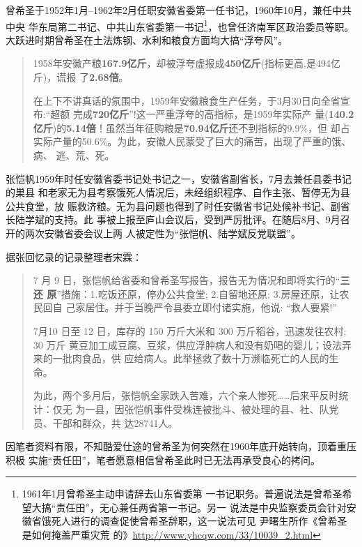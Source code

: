 曾希圣于1952年1月--1962年2月任职安徽省委第一任书记，1960年10月，兼任中共中央
华东局第二书记、中共山东省委第一书记\footnote{1961年1月曾希圣主动申请辞去山东省委第
  一书记职务。普遍说法是曾希圣希望大搞“责任田”，无心兼任两省第一书记。另一
  说法是中央监察委员会针对安徽省饿死人进行的调查促使曾希圣辞职，这一说法可见
  尹曙生所作《曾希圣是如何掩盖严重灾荒
  的》\url{http://www.yhcqw.com/33/10039_2.html}}，也曾任济南军区政治委员等职。
大跃进时期曾希圣在土法炼钢、水利和粮食方面均大搞“浮夸风”。

\begin{quotation}
  1958年安徽产粮\textbf{167.9亿斤}，却被浮夸虚报成\textbf{450亿斤}(指标更高,是494亿斤)，谎报
  了\textbf{2.68倍}。\cite{zhangfandang}

  在上下不讲真话的氛围中，1959年安徽粮食生产任务，于3月30日向全省宣布:“超额
  完成\textbf{720亿斤}”!这一严重浮夸的高指标，是1959年实际产
  量(\textbf{140.2亿斤})的\textbf{5.14倍}！虽然当年征购粮是\textbf{70.94亿斤}还不到指标的9.9\%，但
  却占实际产量的50.6\%。为此，安徽人民蒙受了巨大的痛苦，出现了严重的饿、病、
  逃、荒、死。\cite{zhang1959}
\end{quotation}

张恺帆1959年时任安徽省委书记处书记之一，安徽省副省长，7月去兼任县委书记的巣县
和老家无为县考察饿死人情况后，未经组织程序、自作主张、暂停无为县公共食堂，放
赈救济粮。无为县问题也得到了时任安徽省书记处候补书记、副省长陆学斌的支持。此
事被上报至庐山会议后，受到严厉批评。在随后8月、9月召开的两次安徽省委会议上两
人被定性为“张恺帆、陆学斌反党联盟”。

据张回忆录的记录整理者宋霖：
\begin{quotation}
  7 月 9 日，张恺帆给省委和曾希圣写报告，报告无为情况和即将实行的“\textbf{三还
    原}”措施：1.吃饭还原，停办公共食堂; 2.自留地还原; 3.房屋还原，让农民回自
  己家居住。并于当晚严令县委立即付诸实施，他说: “救人要紧!”

  7月10 日至 12 日，库存的 150 万斤大米和 300 万斤稻谷，迅速发往农村; 30 万斤
  黄豆加工成豆腐、豆浆，供应浮肿病人和没有奶喝的婴儿；设法弄来的一批肉食品，供
  应给病人。此举拯救了数十万濒临死亡的人民的生命。

  为此，两个多月后，张恺帆全家跌入苦难，六个亲人惨死……后来平反时统计：仅无
  为一县，因张恺帆事件受株连被批斗、被处理的县、社、队党员、干部和群众，共
  达28741人。\cite{zhang1959}
\end{quotation}

因笔者资料有限，不知酷爱仕途的曾希圣为何突然在1960年底开始转向，顶着重压积极
实施“责任田”，笔者愿意相信曾希圣此时已无法再承受良心的拷问。

